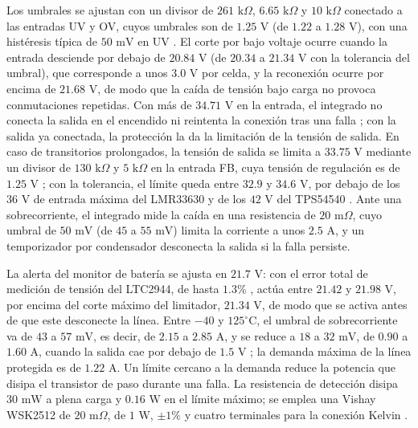 \documentclass[../../General.tex]{subfiles}
\begin{document}
Los umbrales se ajustan con un divisor de $261\text{ k}\Omega$, $6.65\text{ k}\Omega$ y $10\text{ k}\Omega$ conectado a las entradas UV y OV, cuyos umbrales son de $1.25\text{ V}$ (de $1.22$ a $1.28\text{ V}$), con una histéresis típica de $50\text{ mV}$ en UV \citep{adi_ltc4364}. El corte por bajo voltaje ocurre cuando la entrada desciende por debajo de $20.84\text{ V}$ (de $20.34$ a $21.34\text{ V}$ con la tolerancia del umbral), que corresponde a unos $3.0\text{ V}$ por celda, y la reconexión ocurre por encima de $21.68\text{ V}$, de modo que la caída de tensión bajo carga no provoca conmutaciones repetidas. Con más de $34.71\text{ V}$ en la entrada, el integrado no conecta la salida en el encendido ni reintenta la conexión tras una falla \citep{adi_ltc4364}; con la salida ya conectada, la protección la da la limitación de la tensión de salida. En caso de transitorios prolongados, la tensión de salida se limita a $33.75\text{ V}$ mediante un divisor de $130\text{ k}\Omega$ y $5\text{ k}\Omega$ en la entrada FB, cuya tensión de regulación es de $1.25\text{ V}$ \citep{adi_ltc4364}; con la tolerancia, el límite queda entre $32.9$ y $34.6\text{ V}$, por debajo de los $36\text{ V}$ de entrada máxima del LMR33630 \citep{ti_lmr33630} y de los $42\text{ V}$ del TPS54540 \citep{ti_tps54540}. Ante una sobrecorriente, el integrado mide la caída en una resistencia de $20\text{ m}\Omega$, cuyo umbral de $50\text{ mV}$ (de $45$ a $55\text{ mV}$) \citep{adi_ltc4364} limita la corriente a unos $2.5\text{ A}$, y un temporizador por condensador desconecta la salida si la falla persiste.

La alerta del monitor de batería se ajusta en $21.7\text{ V}$: con el error total de medición de tensión del LTC2944, de hasta $1.3\%$ \citep{adi_ltc2944}, actúa entre $21.42$ y $21.98\text{ V}$, por encima del corte máximo del limitador, $21.34\text{ V}$, de modo que se activa antes de que este desconecte la línea. Entre $-40$ y $125^\circ\text{C}$, el umbral de sobrecorriente va de $43$ a $57\text{ mV}$, es decir, de $2.15$ a $2.85\text{ A}$, y se reduce a $18$ a $32\text{ mV}$, de $0.90$ a $1.60\text{ A}$, cuando la salida cae por debajo de $1.5\text{ V}$ \citep{adi_ltc4364}; la demanda máxima de la línea protegida es de $1.22\text{ A}$. Un límite cercano a la demanda reduce la potencia que disipa el transistor de paso durante una falla. La resistencia de detección disipa $30\text{ mW}$ a plena carga y $0.16\text{ W}$ en el límite máximo; se emplea una Vishay WSK2512 de $20\text{ m}\Omega$, de $1\text{ W}$, $\pm 1\%$ y cuatro terminales para la conexión Kelvin \citep{vishay_wsk2512}.
\end{document}
